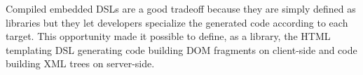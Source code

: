 \documentclass[american,english,runningheads]{llncs}
\begin{document}
Compiled embedded DSLs are a good tradeoff because they are simply defined as libraries but they let developers
specialize the generated code according to each target. This opportunity made it possible to define, as a library,
the HTML templating DSL generating code building DOM fragments on client-side and code building XML trees on
server-side.

% 
\end{document}
